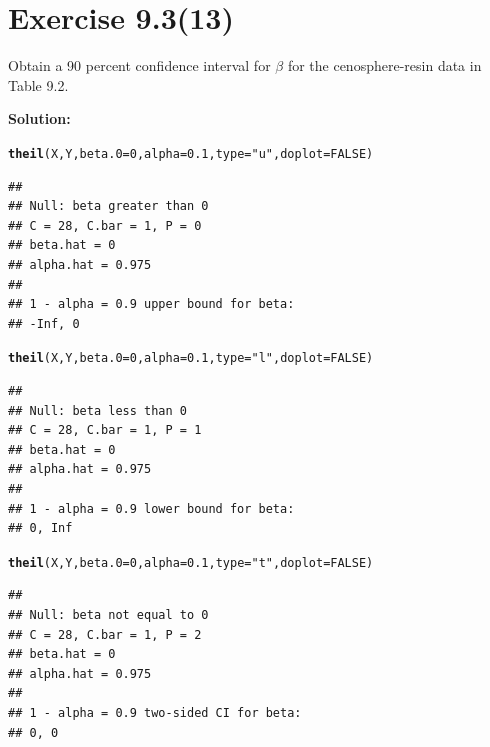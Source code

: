 \documentclass[a4paper]{article}\usepackage[]{graphicx}\usepackage[]{color}
\makeatletter
\newcommand{\hlnum}[1]{\textcolor[rgb]{0.686,0.059,0.569}{#1}}%
\newcommand{\hlstr}[1]{\textcolor[rgb]{0.192,0.494,0.8}{#1}}%
\newcommand{\hlstd}[1]{\textcolor[rgb]{0.345,0.345,0.345}{#1}}%
\newcommand{\hlkwc}[1]{\textcolor[rgb]{0.333,0.667,0.333}{#1}}%
\newcommand{\hlkwd}[1]{\textcolor[rgb]{0.737,0.353,0.396}{\textbf{#1}}}%
\newenvironment{kframe}{%
 \def\at@end@of@kframe{}%
 \ifinner\ifhmode%
  \def\at@end@of@kframe{\end{minipage}}%
  \begin{minipage}{\columnwidth}%
 \fi\fi%
 \def\FrameCommand##1{\hskip\@totalleftmargin \hskip-\fboxsep
 \colorbox{shadecolor}{##1}\hskip-\fboxsep
     \hskip-\linewidth \hskip-\@totalleftmargin \hskip\columnwidth}%
 \MakeFramed {\advance\hsize-\width
   \@totalleftmargin\z@ \linewidth\hsize
   \@setminipage}}%
 {\par\unskip\endMakeFramed%
 \at@end@of@kframe}
\newenvironment{knitrout}{}{} %
\makeatother
\begin{document}
\section{ Exercise 9.3(13)}

Obtain a 90 percent confidence interval for $\beta$ for the cenosphere-resin data in Table 9.2.\\

\vspace{2 mm}

\raggedright{\textbf{Solution:}}\\

\begin{knitrout}
\color{fgcolor}\begin{kframe}
\begin{alltt}
\hlkwd{theil}\hlstd{(X, Y,} \hlkwc{beta.0}\hlstd{=}\hlnum{0}\hlstd{,} \hlkwc{alpha}\hlstd{=}\hlnum{0.1}\hlstd{,} \hlkwc{type}\hlstd{=}\hlstr{"u"}\hlstd{,} \hlkwc{doplot}\hlstd{=}\hlnum{FALSE}\hlstd{)}
\end{alltt}
\begin{verbatim}
## 
## Null: beta greater than 0
## C = 28, C.bar = 1, P = 0
## beta.hat = 0
## alpha.hat = 0.975
## 
## 1 - alpha = 0.9 upper bound for beta:
## -Inf, 0
\end{verbatim}
\begin{alltt}
\hlkwd{theil}\hlstd{(X, Y,} \hlkwc{beta.0}\hlstd{=}\hlnum{0}\hlstd{,} \hlkwc{alpha}\hlstd{=}\hlnum{0.1}\hlstd{,} \hlkwc{type}\hlstd{=}\hlstr{"l"}\hlstd{,} \hlkwc{doplot}\hlstd{=}\hlnum{FALSE}\hlstd{)}
\end{alltt}
\begin{verbatim}
## 
## Null: beta less than 0
## C = 28, C.bar = 1, P = 1
## beta.hat = 0
## alpha.hat = 0.975
## 
## 1 - alpha = 0.9 lower bound for beta:
## 0, Inf
\end{verbatim}
\begin{alltt}
\hlkwd{theil}\hlstd{(X, Y,} \hlkwc{beta.0}\hlstd{=}\hlnum{0}\hlstd{,} \hlkwc{alpha}\hlstd{=}\hlnum{0.1}\hlstd{,} \hlkwc{type}\hlstd{=}\hlstr{"t"}\hlstd{,} \hlkwc{doplot}\hlstd{=}\hlnum{FALSE}\hlstd{)}
\end{alltt}
\begin{verbatim}
## 
## Null: beta not equal to 0
## C = 28, C.bar = 1, P = 2
## beta.hat = 0
## alpha.hat = 0.975
## 
## 1 - alpha = 0.9 two-sided CI for beta:
## 0, 0
\end{verbatim}
\end{kframe}
\end{knitrout}
\end{document}
